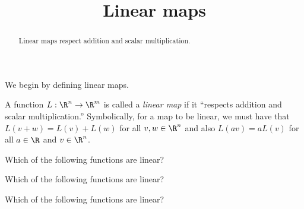 \documentclass{ximera}
\title{Linear maps}
\begin{document}
\begin{abstract}
  Linear maps respect addition and scalar multiplication.
\end{abstract}

We begin by defining linear maps.

\begin{definition}
  A function $L: \R^n \to \R^m$ is called a \textit{linear map} if it
  ``respects addition and scalar multiplication.''  Symbolically, for
  a map to be linear, we must have that $L(v+w) = L(v)+L(w)$ for all
  $v,w \in \R^n$ and also $L(av) = a L(v)$ for all $a \in \R$ and
  $v\in \R^n$.
\end{definition}

\begin{question}
  Which of the following functions are linear?
  \begin{solution}
    \begin{multiple-choice}

    \end{multiple-choice}
  \end{solution}
\end{question}

\begin{question}
  Which of the following functions are linear?
  \begin{solution}
    \begin{multiple-choice}
    \end{multiple-choice}
  \end{solution}
\end{question}

\begin{question}
  Which of the following functions are linear?
  \begin{solution}
    \begin{multiple-choice}
    \end{multiple-choice}
  \end{solution}
\end{question}
	
\end{document}

